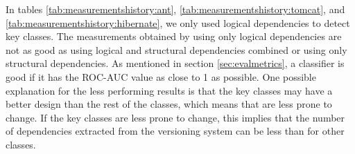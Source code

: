 \documentclass[12pt]{mitthesis}
\begin{document}
\begin{table}[!h]
\renewcommand{\arraystretch}{1}
\caption{Measurements for Hibernate using structural and logical dependencies combined}
\label{tab:measurementscombined:hibernate}
\centering
{}
\end{table}



In tables \ref{tab:measurementshistory:ant}, \ref{tab:measurementshistory:tomcat}, and \ref{tab:measurementshistory:hibernate}, we only used logical dependencies to detect key classes. The measurements obtained by using only logical dependencies are not as good as using logical and structural dependencies combined or using only structural dependencies.
As mentioned in section \ref{sec:evalmetrics}, a classifier is good if it has the ROC-AUC value as close to 1 as possible. 
One possible explanation for the less performing results is that the key classes may have a better design than the rest of the classes, which means that are less prone to change. If the key classes are less prone to change, this implies that the number of dependencies extracted from the versioning system can be less than for other classes.
\end{document}
